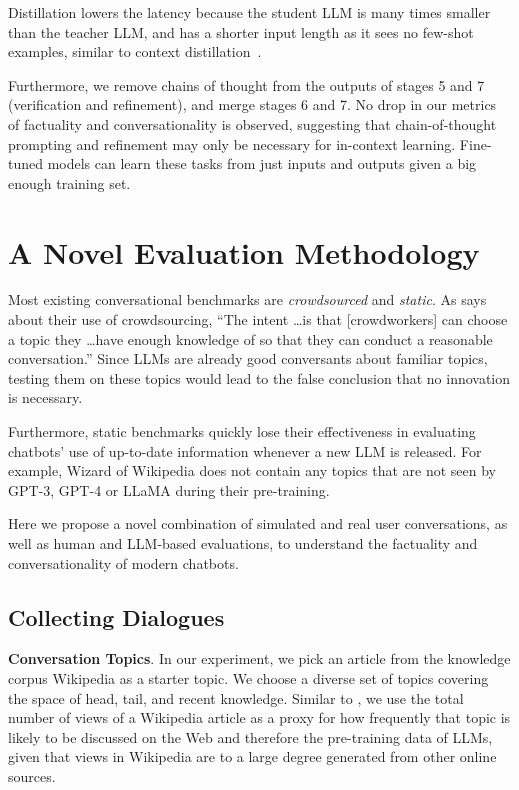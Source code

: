 \documentclass[11pt]{article}
\begin{document}
Distillation lowers the latency because the student LLM is many times smaller than the teacher LLM, and has a shorter input length as it sees no few-shot examples, similar to context distillation~\cite{snell2022learning}. 

Furthermore, 
we remove chains of thought from the outputs of stages 5 and 7 (verification and refinement), and merge stages 6 and 7. No drop in our metrics of factuality and conversationality is observed, suggesting that chain-of-thought prompting and refinement may only be necessary for in-context learning. Fine-tuned models can learn these tasks from just inputs and outputs given a big enough training set.


\section{A Novel Evaluation Methodology}
\label{sec:evaluation}

Most existing conversational benchmarks are \emph{crowdsourced} and \emph{static}.
As \citet{komeili-etal-2022-internet} says about their use of crowdsourcing, ``The intent \ldots is that [crowdworkers] can choose a topic they \ldots have enough knowledge of so that they can conduct a reasonable conversation.'' Since LLMs are already good conversants about familiar topics, testing them on these topics would lead to the false conclusion that no innovation is necessary. 

Furthermore, static benchmarks quickly lose their effectiveness in evaluating chatbots' use of up-to-date information whenever a new LLM is released. 
For example, Wizard of Wikipedia does not contain any topics that are not seen by GPT-3, GPT-4 or LLaMA during their pre-training. 

Here we propose a novel combination of simulated and real user conversations, as well as human and LLM-based evaluations, to understand the factuality and conversationality of modern chatbots. 

\subsection{Collecting Dialogues}
{\bf Conversation Topics}.
In our experiment, we pick an article from the knowledge corpus Wikipedia as a starter topic. 
We choose a diverse set of topics covering the space of head, tail, and recent knowledge. 
Similar to \citet{mallen2022trust}, we use the total number of views of a Wikipedia article as a proxy for how frequently that topic is likely to be discussed on the Web and therefore the pre-training data of LLMs, given that views in Wikipedia are to a large degree generated from other online sources. 
\end{document}
